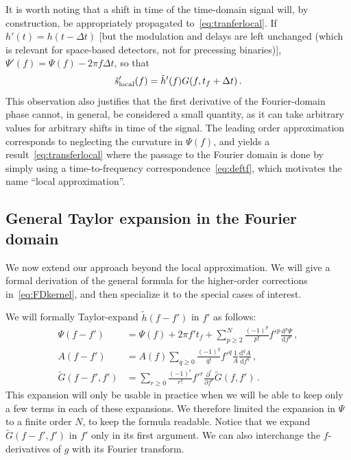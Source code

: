 \documentclass[aps,showpacs,twocolumn,
prd,superscriptaddress,nofootinbib]{revtex4-1}
\newcommand{\be}{\begin{equation}}
\newcommand{\ee}{\end{equation}}
\newcommand\ud{{\mathrm{d}}}
\newcommand{\tf}{t_{f}}
\begin{document}
It is worth noting that a shift in time of the time-domain signal will, by construction, be appropriately propagated to~\eqref{eq:tranferlocal}. If $h'(t) = h(t -  \Delta t)$ [but the modulation and delays are left unchanged (which is relevant for space-based detectors, not for precessing binaries)], $\Psi'(f) = \Psi(f) - 2\pi f \Delta t$, so that
\be\label{eq:localshifted}
	\tilde{s}'_{\rm local}(f) = \tilde{h}'(f) G(f, \tf + \Delta t) \,. 
\ee
This observation also justifies that the first derivative of the Fourier-domain phase cannot, in general, be considered a small quantity, as it can take arbitrary values for arbitrary shifts in time of the signal. The leading order approximation corresponds to neglecting the curvature in $\Psi(f)$, and yields a result~\eqref{eq:transferlocal} where the passage to the Fourier domain is done by simply using a time-to-frequency correspondence~\eqref{eq:deftf}, which motivates the name ``local approximation''.


\subsection{General Taylor expansion in the Fourier domain}
\label{subsec:TaylorFD}

We now extend our approach beyond the local approximation. We will give a formal derivation of the  general formula for the higher-order corrections in~\eqref{eq:FDkernel}, and then specialize it to the special cases of interest.

We will formally Taylor-expand $\tilde{h}(f-f')$ in $f'$ as follows:
\begin{subequations}
\begin{align}
	\Psi(f-f') &= \Psi(f) + 2\pi f' \tf + \sum\limits_{p\geq 2}^{N} \frac{(-1)^{p}}{p!} {f'}^{p} \frac{\ud^{p} \Psi}{\ud f^{p}} \,, \label{eq:expandPsi}\\
	A(f-f') &= A(f) \sum\limits_{q\geq 0} \frac{(-1)^{q}}{q!} {f'}^{q} \frac{1}{A}\frac{\ud^{q} A}{\ud f^{q}} \,, \label{eq:expandA}\\
	\tilde{G}(f-f', f') &= \sum\limits_{r\geq 0} \frac{(-1)^{r}}{r!} {f'}^{r} \frac{\partial^{r} }{\partial f^{r}}  \tilde{G}(f,f') \label{eq:expandg} \,.
\end{align}
\end{subequations}
This expansion will only be usable in practice when we will be able to keep only a few terms in each of these expansions. We therefore limited the expansion in $\Psi$ to a finite order $N$, to keep the formula readable. Notice that we expand $\tilde{G}(f-f',f')$ in $f'$ only in its first argument. We can also interchange the $f$-derivatives of $g$ with its Fourier transform.
\end{document}
